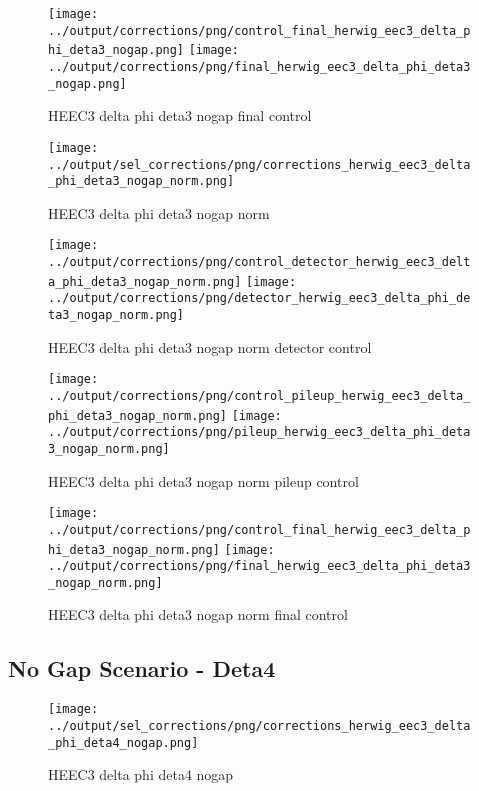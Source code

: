 \documentclass[11pt]{book}
\begin{document}
\begin{figure}[ht]
\centering
\texttt{[image: ../output/corrections/png/control\_final\_herwig\_eec3\_delta\_phi\_deta3\_nogap.png]}
\texttt{[image: ../output/corrections/png/final\_herwig\_eec3\_delta\_phi\_deta3\_nogap.png]}
\caption{HEEC3 delta phi deta3 nogap final control}
\label{fig:HEEC3_delta_phi_deta3_nogap_final_control}
\end{figure}

\begin{figure}[ht]
\centering
\texttt{[image: ../output/sel\_corrections/png/corrections\_herwig\_eec3\_delta\_phi\_deta3\_nogap\_norm.png]}
\caption{HEEC3 delta phi deta3 nogap norm}
\label{fig:HEEC3_delta_phi_deta3_nogap_norm}
\end{figure}


\begin{figure}[ht]
\centering
\texttt{[image: ../output/corrections/png/control\_detector\_herwig\_eec3\_delta\_phi\_deta3\_nogap\_norm.png]}
\texttt{[image: ../output/corrections/png/detector\_herwig\_eec3\_delta\_phi\_deta3\_nogap\_norm.png]}
\caption{HEEC3 delta phi deta3 nogap norm detector control}
\label{fig:HEEC3_delta_phi_deta3_nogap_norm_detector_control}
\end{figure}

\begin{figure}[ht]
\centering
\texttt{[image: ../output/corrections/png/control\_pileup\_herwig\_eec3\_delta\_phi\_deta3\_nogap\_norm.png]}
\texttt{[image: ../output/corrections/png/pileup\_herwig\_eec3\_delta\_phi\_deta3\_nogap\_norm.png]}
\caption{HEEC3 delta phi deta3 nogap norm pileup control}
\label{fig:HEEC3_delta_phi_deta3_nogap_norm_pileup_control}
\end{figure}


\begin{figure}[ht]
\centering
\texttt{[image: ../output/corrections/png/control\_final\_herwig\_eec3\_delta\_phi\_deta3\_nogap\_norm.png]}
\texttt{[image: ../output/corrections/png/final\_herwig\_eec3\_delta\_phi\_deta3\_nogap\_norm.png]}
\caption{HEEC3 delta phi deta3 nogap norm final control}
\label{fig:HEEC3_delta_phi_deta3_nogap_norm_final_control}
\end{figure}

\clearpage
\subsection{No Gap Scenario - Deta4}
\begin{figure}[ht]
\centering
\texttt{[image: ../output/sel\_corrections/png/corrections\_herwig\_eec3\_delta\_phi\_deta4\_nogap.png]}
\caption{HEEC3 delta phi deta4 nogap}
\label{fig:HEEC3_delta_phi_deta4_nogap}
\end{figure}
\end{document}
